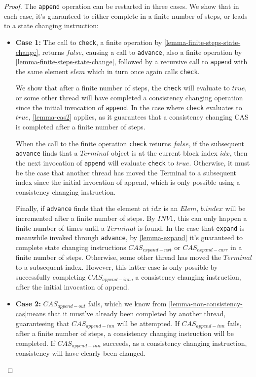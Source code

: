 \documentclass[runningheads,a4paper]{llncs}
\begin{document}
\begin{proof}
The \verb=append= operation can be restarted in three cases. We show that in
each case, it's guaranteed to either complete in a finite number of steps,  or
leads to a state changing instruction:

\begin{itemize} 

\item \textbf{Case 1:} The call to \verb=check=, a finite operation by 
\ref{lemma-finite-steps-state-change}, returns $false$,  causing a call to
\verb=advance=, also a finite operation by 
\ref{lemma-finite-steps-state-change}, followed by a recursive call to 
\verb=append= with the same element $elem$ which in turn once again calls 
\verb=check=.

We show that after a finite number of steps, the \verb=check= will evaluate to
$true$, or some other thread will have completed a consistency changing
operation since the initial invocation of \verb=append=. In the case where
\verb=check= evaluates to $true$, \ref{lemma-cas2} applies, as it
guarantees that a consistency changing CAS is completed after a finite number
of steps.

When the call to the finite operation \verb=check= returns $false$, if the
subsequent \verb=advance= finds that a $Terminal$ object is at the current
block index $idx$, then the next invocation of \verb=append= will evaluate
\verb=check= to $true$. Otherwise, it must be the case that another thread has
moved the Terminal to a subsequent index since the initial invocation of
append, which is only possible using a consistency changing instruction.

Finally, if \verb=advance= finds that the element at $idx$ is an
$Elem$,
$b.index$ will be incremented after a finite number of steps. By
$INV1$, this can only happen a finite number of times until a $Terminal$ is
found. In the case that \verb=expand= is meanwhile invoked through
\verb=advance=, by \ref{lemma-expand} it's guaranteed to complete state
changing instructions $CAS_{expand-nxt}$ or $CAS_{expand-curr}$ in a finite
number of steps. Otherwise, some other thread has moved the $Terminal$ to a
subsequent index. However, this latter case is only possible by successfully
completing $CAS_{append-inn}$, a consistency changing instruction, after the
initial invocation of append.

\item \textbf{Case 2:} $CAS_{append-out}$ fails, which we know from 
\ref{lemma-non-consistency-cas}means that it must've already been completed by
another thread, guaranteeing that $CAS_{append-inn}$ will be attempted. If
$CAS_{append-inn}$ fails,
after a finite number of steps, a
consistency changing instruction will be completed. If $CAS_{append-inn}$
succeeds, as a consistency changing instruction, consistency will have clearly
been changed.


\end{itemize}
\end{proof}
\end{document}
